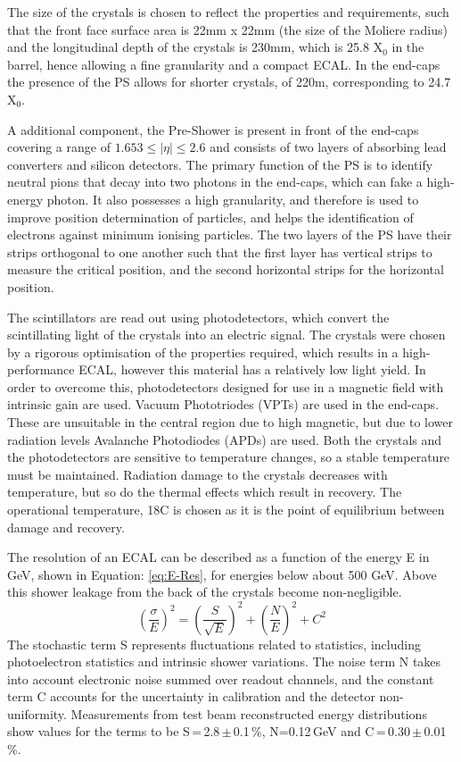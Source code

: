  The size of the crystals is chosen to reflect the properties and requirements, such that the front face surface area is 22mm x 22mm (the size of the Moliere radius) and the longitudinal depth of the crystals is 230mm, which is 25.8 X$_{0}$ in the barrel, hence allowing a fine granularity and a compact ECAL. In the end-caps the presence of the PS allows for shorter crystals, of 220m, corresponding to 24.7 X$_{0}$.

A additional component, the Pre-Shower is present in front of the end-caps covering a range of $1.653\leq |\eta|\leq2.6$ and consists of two layers of absorbing lead converters and silicon detectors. The primary function of the PS is to identify neutral pions that decay into two photons in the end-caps, which can fake a high-energy photon. It also possesses a high granularity, and therefore is used to improve position determination of particles, and helps the identification of electrons against minimum ionising particles. The two layers of the PS have their strips orthogonal to one another such that the first layer has vertical strips to measure the critical position, and the second horizontal strips for the horizontal position. 

The scintillators are read out using photodetectors, which convert the scintillating light of the crystals into an electric signal. The crystals were chosen by a rigorous optimisation of the properties required, which results in a high-performance ECAL, however this material has a relatively low light yield. In order to overcome this, photodetectors designed for use in a magnetic field with intrinsic gain are used. Vacuum Phototriodes  (VPTs) are used in the end-caps. These are unsuitable in the central region due to high magnetic, but due to lower radiation levels Avalanche Photodiodes (APDs) are used. Both the crystals and the photodetectors are sensitive to temperature changes, so a stable temperature must be maintained. Radiation damage to the crystals decreases with temperature, but so do the thermal effects which result in recovery. The operational temperature, 18C is chosen as it is the point of equilibrium between damage and recovery.


The resolution of an ECAL can be described as a function of the energy E in GeV, shown in Equation: \ref{eq:E-Res}, for energies below about 500 GeV. Above this shower leakage from the back of the crystals become non-negligible. 
\begin{equation}
\left(\frac{\sigma}{E}\right)^2 = \left(\frac{S}{\sqrt{E}}\right)^2 + \left(\frac{N}{E}\right)^2 + C^2
\label{eq:E-Res}
\end{equation}
The stochastic term S represents fluctuations related to statistics, including photoelectron statistics and intrinsic shower variations. The noise term N takes into account electronic noise summed over readout channels, and the constant term C accounts for the uncertainty in calibration and the detector non-uniformity. Measurements from test beam reconstructed energy distributions show values for the terms to be S\,=\,2.8\,$\pm$\,0.1\,\%, N=0.12\,GeV and C\,=\,0.30\,$\pm$\,0.01\,\%. 



